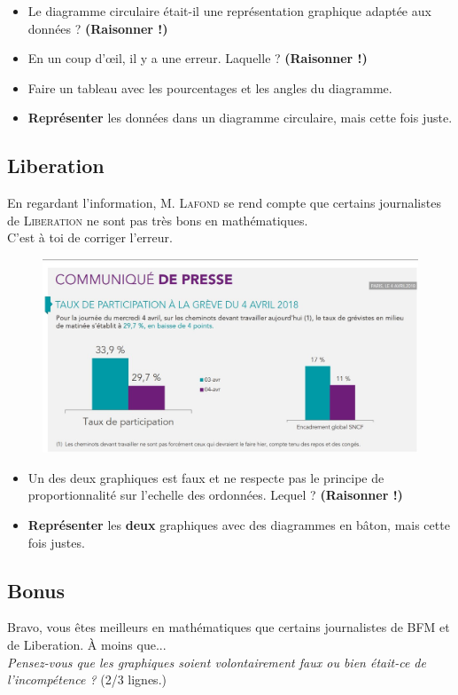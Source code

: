 \documentclass[12pt]{article}
\begin{document}
\begin{itemize}
	\item[1.] Le diagramme circulaire était-il une représentation graphique adaptée aux données ? \textbf{(Raisonner !)}
	\item[2.] En un coup d'œil, il y a une erreur. Laquelle ? \textbf{(Raisonner !)}
	\item[3.] Faire un tableau avec les pourcentages et les angles du diagramme.
	\item[4.] \textbf{Représenter} les données dans un diagramme circulaire, mais cette fois juste.
\end{itemize}	

\subsection*{Liberation}

\begin{multicols}{2}

En regardant l'information, \textsc{M. Lafond} se rend compte que certains journalistes de \textsc{Liberation} ne sont pas très bons en mathématiques.\\
C'est à toi de corriger l'erreur. 

\begin{figure}[H]
	\centering
	\includegraphics[width=\linewidth]{3x1-statistiques/sources/liberation.jpg}
\end{figure}

\end{multicols}

\begin{itemize}
	\item[1.] Un des deux graphiques est faux et ne respecte pas le principe de proportionnalité sur l'echelle des ordonnées. Lequel ? \textbf{(Raisonner !)}
	\item[2.] \textbf{Représenter} les \textbf{deux} graphiques avec des diagrammes en bâton, mais cette fois justes.
\end{itemize}	

\subsection*{Bonus}

Bravo, vous êtes meilleurs en mathématiques que certains journalistes de BFM et de Liberation. À moins que... \\
\textit{Pensez-vous que les graphiques soient volontairement faux ou bien était-ce de l'incompétence ?} (2/3 lignes.)
\end{document}
